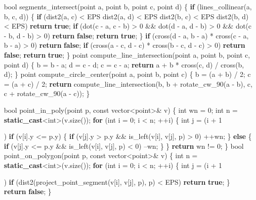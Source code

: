\documentclass[10pt,]{article}
\newenvironment{Shaded}{}{}
\newcommand{\KeywordTok}[1]{\textcolor[rgb]{0.00,0.44,0.13}{\textbf{{#1}}}}
\newcommand{\DataTypeTok}[1]{\textcolor[rgb]{0.56,0.13,0.00}{{#1}}}
\newcommand{\DecValTok}[1]{\textcolor[rgb]{0.25,0.63,0.44}{{#1}}}
\newcommand{\NormalTok}[1]{{#1}}
\begin{document}
\begin{Shaded}
\begin{Highlighting}[]
\DataTypeTok{bool} \NormalTok{segments_intersect(point a, point b, point c, point d) \{}
  \KeywordTok{if} \NormalTok{(lines_collinear(a, b, c, d)) \{}
    \KeywordTok{if} \NormalTok{(dist2(a, c) < EPS \textbar{}\textbar{} dist2(a, d) < EPS \textbar{}\textbar{}}
        \NormalTok{dist2(b, c) < EPS \textbar{}\textbar{} dist2(b, d) < EPS) }\KeywordTok{return} \KeywordTok{true}\NormalTok{;}
    \KeywordTok{if} \NormalTok{(dot(c - a, c - b) > }\DecValTok{0} \NormalTok{&& dot(d - a, d - b) > }\DecValTok{0} \NormalTok{&&}
        \NormalTok{dot(c - b, d - b) > }\DecValTok{0}\NormalTok{) }\KeywordTok{return} \KeywordTok{false}\NormalTok{;}
    \KeywordTok{return} \KeywordTok{true}\NormalTok{;}
  \NormalTok{\}}
  \KeywordTok{if} \NormalTok{(cross(d - a, b - a) * cross(c - a, b - a) > }\DecValTok{0}\NormalTok{) }\KeywordTok{return} \KeywordTok{false}\NormalTok{;}
  \KeywordTok{if} \NormalTok{(cross(a - c, d - c) * cross(b - c, d - c) > }\DecValTok{0}\NormalTok{) }\KeywordTok{return} \KeywordTok{false}\NormalTok{;}
  \KeywordTok{return} \KeywordTok{true}\NormalTok{;}
\NormalTok{\}}
\NormalTok{point compute_line_intersection(point a, point b, point c, point d) \{}
  \NormalTok{b = b - a; d = c - d; c = c - a;}
  \KeywordTok{return} \NormalTok{a + b * cross(c, d) / cross(b, d);}
\NormalTok{\}}
\NormalTok{point compute_circle_center(point a, point b, point c) \{}
  \NormalTok{b = (a + b) / }\DecValTok{2}\NormalTok{;}
  \NormalTok{c = (a + c) / }\DecValTok{2}\NormalTok{;}
  \KeywordTok{return} \NormalTok{compute_line_intersection(b, b + rotate_cw_90(a - b),}
      \NormalTok{c, c + rotate_cw_90(a - c));}
\NormalTok{\}}

\DataTypeTok{bool} \NormalTok{point_in_poly(point p, }\DataTypeTok{const} \NormalTok{vector<point>& v) \{}
  \DataTypeTok{int} \NormalTok{wn = }\DecValTok{0}\NormalTok{;}
  \DataTypeTok{int} \NormalTok{n = }\KeywordTok{static_cast}\NormalTok{<}\DataTypeTok{int}\NormalTok{>(v.size());}
  \KeywordTok{for} \NormalTok{(}\DataTypeTok{int} \NormalTok{i = }\DecValTok{0}\NormalTok{; i < n; ++i) \{}
    \DataTypeTok{int} \NormalTok{j = (i + }\DecValTok{1}\NormalTok{) % n;}
    \KeywordTok{if} \NormalTok{(v[i].y <= p.y) \{}
      \KeywordTok{if} \NormalTok{(v[j].y > p.y && is_left(v[i], v[j], p) > }\DecValTok{0}\NormalTok{)}
        \NormalTok{++wn;}
    \NormalTok{\} }\KeywordTok{else} \NormalTok{\{}
      \KeywordTok{if} \NormalTok{(v[j].y <= p.y && is_left(v[i], v[j], p) < }\DecValTok{0}\NormalTok{)}
        \NormalTok{--wn;}
    \NormalTok{\}}
  \NormalTok{\}}
  \KeywordTok{return} \NormalTok{wn != }\DecValTok{0}\NormalTok{;}
\NormalTok{\}}
\DataTypeTok{bool} \NormalTok{point_on_polygon(point p, }\DataTypeTok{const} \NormalTok{vector<point>& v) \{}
  \DataTypeTok{int} \NormalTok{n = }\KeywordTok{static_cast}\NormalTok{<}\DataTypeTok{int}\NormalTok{>(v.size());}
  \KeywordTok{for} \NormalTok{(}\DataTypeTok{int} \NormalTok{i = }\DecValTok{0}\NormalTok{; i < n; ++i) \{}
    \DataTypeTok{int} \NormalTok{j = (i + }\DecValTok{1}\NormalTok{) % n;}
    \KeywordTok{if} \NormalTok{(dist2(project_point_segment(v[i], v[j], p), p) < EPS)}
      \KeywordTok{return} \KeywordTok{true}\NormalTok{;}
  \NormalTok{\}}
  \KeywordTok{return} \KeywordTok{false}\NormalTok{;}
\NormalTok{\}}

}}
\end{Highlighting}
\end{Shaded}
\end{document}
